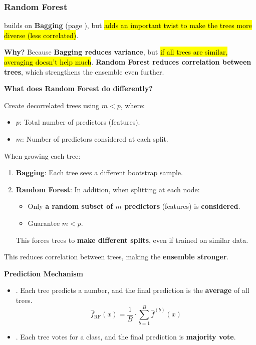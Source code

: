 \subsubsection{Random Forest}

 builds on \textbf{Bagging} (page \pageref{subsubsection: Bagging}), but \hl{adds an important twist to make the trees more diverse (less correlated)}.

\highspace
\textcolor{Green3}{ \textbf{Why?}} Because \textbf{Bagging reduces variance}, but \hl{if all trees are similar, averaging doesn't help much}. \textbf{Random Forest reduces correlation between trees}, which strengthens the ensemble even further.

\highspace
\begin{flushleft}
    \textcolor{Green3}{ \textbf{What does Random Forest do differently?}}
\end{flushleft}
Create decorrelated trees using $m < p$, where:
\begin{itemize}
    \item $p$: Total number of predictors (features).
    \item $m$: Number of predictors considered at each split.
\end{itemize}
When growing each tree:
\begin{enumerate}
    \item \textbf{Bagging}: Each tree sees a different bootstrap sample.
    \item \textbf{Random Forest}: In addition, when splitting at each node:
    \begin{itemize}
        \item Only \textbf{a random subset of $m$ predictors} (features) is \textbf{considered}.
        \item Guarantee $m < p$.
    \end{itemize}
    This forces trees to \textbf{make different splits}, even if trained on similar data.
\end{enumerate}
This reduces correlation between trees, making the \textbf{ensemble stronger}.

\highspace
\begin{flushleft}
    \textcolor{Green3}{ \textbf{Prediction Mechanism}}
\end{flushleft}
\begin{itemize}
    \item {}. Each tree predicts a number, and the final prediction is the \textbf{average} of all trees.
    \begin{equation*}
        \hat{f}_{\text{RF}}(x) = \frac{1}{B} \cdot \sum_{b=1}^B \hat{f}^{(b)}(x)
    \end{equation*}
    \item {}. Each tree votes for a class, and the final prediction is \textbf{majority vote}.
\end{itemize}

